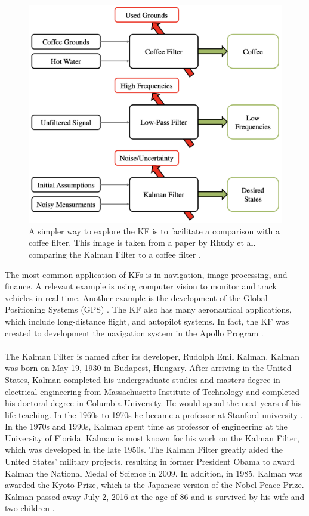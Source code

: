 \begin{figure}[h]
    \centering
    \includegraphics[scale = 0.3]{coffee.png}
    \caption{A simpler way to explore the KF is to facilitate a comparison with a coffee filter. This image is taken from a paper by Rhudy et al. comparing the Kalman Filter to a coffee filter \cite{article7}.}
    \end{figure}

\newpage

\noindent The most common application of KFs is in navigation, image processing, and finance. A relevant example is using computer vision to monitor and track vehicles in real time. Another example is the development of the Global Positioning Systems (GPS) \cite{lim_ong_lim_koo_2016}. The KF also has many aeronautical applications, which include long-distance flight,  and autopilot systems. In fact, the KF was created to development the navigation system in the Apollo Program \cite{kalmanbio}.  \\ \\


\noindent The Kalman Filter is named after its developer, Rudolph Emil Kalman. Kalman was born on May 19, 1930 in Budapest, Hungary. After arriving in the United States, Kalman completed his undergraduate studies and masters degree in electrical engineering from Massachusetts Institute of Technology and completed his doctoral degree in Columbia University. He would spend the next years of his life teaching. In the 1960s to 1970s he became a professor at Stanford university \cite{kalmanbio}. In the 1970s and 1990s, Kalman spent time as professor of  engineering at the University of Florida. Kalman is most known for his work on the Kalman Filter, which was developed in the late 1950s. The Kalman Filter greatly aided the United States' military projects, resulting in former President Obama to award Kalman the National Medal of Science in 2009. In addition, in 1985, Kalman was awarded the Kyoto Prize, which is the Japanese version of the Nobel Peace Prize. Kalman passed away July 2, 2016 at the age of 86 and is survived by his wife and two children \cite{Kalman_bio}. 



